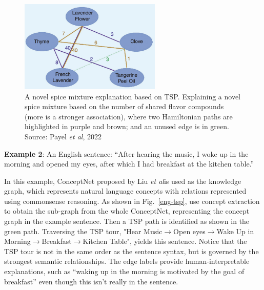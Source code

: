 \documentclass[]{article}
\newcommand{\etal}{\textit{et al}}
\begin{document}
\begin{figure}[htbp]
\centering
\includegraphics[width=0.6\textwidth]{FIGS/flavor_tsp.png}
\caption{A novel spice mixture explanation based on TSP. Explaining a novel spice mixture based on the number of shared flavor compounds (more is a stronger association), where two Hamiltonian paths are highlighted in purple and brown; and an unused edge is in green. Source: Payel \etal, 2022\cite{b1}}
\label{fl-tsp}
\end{figure}

\vspace{0.5cm}
\noindent\textbf{Example 2}: An English sentence: “After hearing the music, I woke up in the morning and opened my eyes, after which I had breakfast at the kitchen table.”

In this example, ConceptNet proposed by Liu \etal \cite{b4}is used as the 
knowledge graph, which represents natural language concepts with relations represented using commonsense reasoning. 
As shown in Fig.~\ref{eng-tsp}, use concept extraction to obtain the sub-graph from the whole ConceptNet, representing the concept graph in the example sentence. 
Then a TSP path is identified as shown in the green path. Traversing the TSP tour, "Hear Music$\rightarrow$Open eyes$\rightarrow$Wake Up in Morning$\rightarrow$Breakfast$\rightarrow$Kitchen Table", yields this sentence. 
Notice that the TSP tour is not in the same order as the sentence syntax, but is governed by the strongest semantic relationships. 
The edge labels provide human-interpretable explanations, such as “waking up in the morning is motivated by the goal of breakfast” even though this isn’t really in the sentence. 
\end{document}
